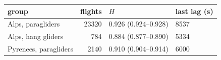 \begin{tabular}{lrll}
\toprule
group & flights & $H$ & last lag (s) \\
\midrule
Alps, paragliders & 23320 & 0.926 (0.924--0.928) & 8537 \\
Alps, hang gliders & 784 & 0.884 (0.877--0.890) & 5334 \\
Pyrenees, paragliders & 2140 & 0.910 (0.904--0.914) & 6000 \\
\bottomrule
\end{tabular}
